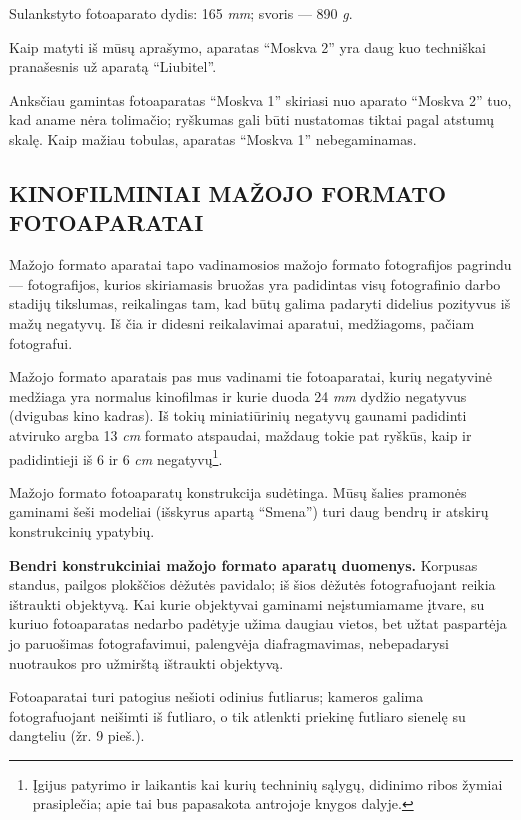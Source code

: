 \documentclass[12pt]{book}
\begin{document}
			Sulankstyto fotoaparato dydis: 165   \textit{mm}; svoris --- 890 \textit{g}.

			Kaip matyti iš mūsų aprašymo, aparatas ``Moskva 2'' yra daug kuo techniškai pranašesnis už aparatą ``Liubitel''.

			Anksčiau gamintas fotoaparatas ``Moskva 1'' skiriasi nuo aparato ``Moskva 2'' tuo, kad aname nėra tolimačio; ryškumas gali būti nustatomas tiktai pagal atstumų skalę. Kaip mažiau tobulas, aparatas ``Moskva 1'' nebegaminamas.
		\subsection*{KINOFILMINIAI MAŽOJO FORMATO FOTOAPARATAI}
			Mažojo formato aparatai tapo vadinamosios mažojo formato fotografijos pagrindu --- fotografijos, kurios skiriamasis bruožas yra padidintas visų fotografinio darbo stadijų tikslumas, reikalingas tam, kad būtų galima padaryti didelius pozityvus iš mažų negatyvų. Iš čia ir didesni reikalavimai aparatui, medžiagoms, pačiam fotografui.

			Mažojo formato aparatais pas mus vadinami tie fotoaparatai, kurių negatyvinė medžiaga yra normalus kinofilmas ir kurie duoda 24  \textit{mm} dydžio negatyvus (dvigubas kino kadras). Iš tokių miniatiūrinių negatyvų gaunami padidinti atviruko argba 13  \textit{cm} formato atspaudai, maždaug tokie pat ryškūs, kaip ir padidintieji iš 6  ir 6  \textit{cm} negatyvų\footnote{Įgijus patyrimo ir laikantis kai kurių techninių sąlygų, didinimo ribos žymiai prasiplečia; apie tai bus papasakota antrojoje knygos dalyje.}.

			Mažojo formato fotoaparatų konstrukcija sudėtinga. Mūsų šalies pramonės gaminami šeši modeliai (išskyrus apartą ``Smena'') turi daug bendrų ir atskirų konstrukcinių ypatybių.

			\textbf{Bendri konstrukciniai mažojo formato aparatų duomenys.} Korpusas standus, pailgos plokščios dėžutės pavidalo; iš šios dėžutės fotografuojant reikia ištraukti objektyvą. Kai kurie objektyvai gaminami neįstumiamame įtvare, su kuriuo fotoaparatas nedarbo padėtyje užima daugiau vietos, bet užtat paspartėja jo paruošimas fotografavimui, palengvėja diafragmavimas, nebepadarysi nuotraukos pro užmirštą ištraukti objektyvą.

			Fotoaparatai turi patogius nešioti odinius futliarus; kameros galima fotografuojant neišimti iš futliaro, o tik atlenkti priekinę futliaro sienelę su dangteliu (žr. 9 pieš.).
\end{document}
